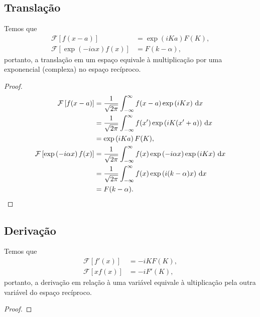 \subsection{Translação}
Temos que
\begin{align*}
    \mathcal{F}\left[ f(x - a) \right] &= \exp\left( i K a \right) F(K), \\
    \mathcal{F}\left[ \exp\left( -i \alpha x \right) f(x) \right] &= F(k -
    \alpha),
\end{align*}
portanto, a translação em um espaço equivale \`{a}
multiplicação por uma exponencial (complexa) no espaço
recíproco.
\begin{proof}
    \begin{align*}
        \mathcal{F}\left[ f(x - a) \right] &= \frac{1}{\sqrt{2 \pi}}
        \int_{-\infty}^\infty f(x - a) \exp\left( i K x \right) \, \mathrm{d}x \\
        &= \frac{1}{\sqrt{2 \pi}} \int_{-\infty}^\infty f(x') \exp\left( i K(x'
        + a) \right) \, \mathrm{d}x \\
        &= \exp\left( i K a \right) F(K), \\ \mathcal{F}\left[ \exp\left( -i
        \alpha x \right) f(x) \right] &= \frac{1}{\sqrt{2 \pi}}
        \int_{-\infty}^\infty f(x) \exp\left( -i \alpha x \right) \exp\left( i K
        x \right) \, \mathrm{d}x \\
        &= \frac{1}{\sqrt{2 \pi}} \int_{-\infty}^\infty f(x) \exp\left( i (k -
        \alpha) x \right) \, \mathrm{d}x \\
        &= F(k - \alpha).
    \end{align*}
\end{proof}

\subsection{Derivação}
Temos que
\begin{align*}
    \mathcal{F}\left[ f'(x) \right] &= -i K F(K), \\
    \mathcal{F}\left[ x f(x) \right] &= -i F'(K),
\end{align*}
portanto, a derivação em relação \`{a} uma variável equivale
\`{a} ultiplicação pela outra variável do espaço recíproco.
\begin{proof}
\end{proof}

